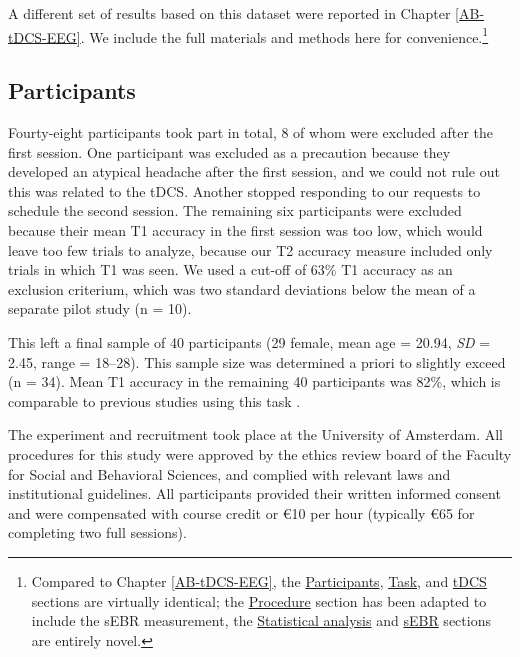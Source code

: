 \documentclass[11pt,]{memoir}
\let\rmarkdownfootnote\footnote%
\def\footnote{\protect\rmarkdownfootnote}
\begin{document}
A different set of results based on this dataset were reported in Chapter \ref{AB-tDCS-EEG}. We include the full materials and methods here for convenience.\footnote{Compared to Chapter \ref{AB-tDCS-EEG}, the \protect\hyperlink{AB_sEBR-participants}{Participants}, \protect\hyperlink{AB_sEBR-task}{Task}, and \protect\hyperlink{AB_sEBR-tDCS}{tDCS} sections are virtually identical; the \protect\hyperlink{AB_sEBR-procedure}{Procedure} section has been adapted to include the sEBR measurement, the \protect\hyperlink{AB_sEBR-stats}{Statistical analysis} and \protect\hyperlink{AB_sEBR-sEBR}{sEBR} sections are entirely novel.}

\hypertarget{AB_sEBR-participants}{%
\subsection{Participants}\label{AB_sEBR-participants}}

Fourty-eight participants took part in total, 8 of whom were excluded after the first session. One participant was excluded as a precaution because they developed an atypical headache after the first session, and we could not rule out this was related to the tDCS. Another stopped responding to our requests to schedule the second session. The remaining six participants were excluded because their mean T1 accuracy in the first session was too low, which would leave too few trials to analyze, because our T2 accuracy measure included only trials in which T1 was seen. We used a cut-off of 63\% T1 accuracy as an exclusion criterium, which was two standard deviations below the mean of a separate pilot study (n = 10).

This left a final sample of 40 participants (29 female, mean age = 20.94, \emph{SD} = 2.45, range = 18--28). This sample size was determined a priori to slightly exceed \textcite{London2015} (n = 34). Mean T1 accuracy in the remaining 40 participants was 82\%, which is comparable to previous studies using this task \autocites[86\% in][]{London2015}[in 82\% in][]{Slagter2013}.

The experiment and recruitment took place at the University of Amsterdam. All procedures for this study were approved by the ethics review board of the Faculty for Social and Behavioral Sciences, and complied with relevant laws and institutional guidelines. All participants provided their written informed consent and were compensated with course credit or €10 per hour (typically €65 for completing two full sessions).
\end{document}
